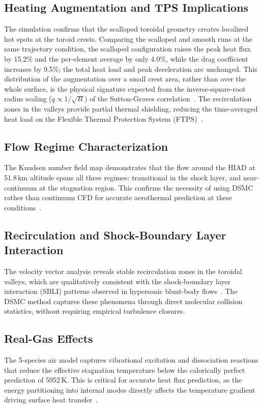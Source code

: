 \subsection{Heating Augmentation and TPS Implications}
The simulation confirms that the scalloped toroidal geometry creates localized hot spots at the toroid crests. Comparing the scalloped and smooth runs at the same trajectory condition, the scalloped configuration raises the peak heat flux by 15.2\% and the per-element average by only 4.0\%, while the drag coefficient increases by 9.5\%; the total heat load and peak deceleration are unchanged. This distribution of the augmentation over a small crest area, rather than over the whole surface, is the physical signature expected from the inverse-square-root radius scaling ($\dot{q} \propto 1/\sqrt{R}$) of the Sutton-Graves correlation~\cite{sutton1971gravesh}. The recirculation zones in the valleys provide partial thermal shielding, reducing the time-averaged heat load on the Flexible Thermal Protection System (FTPS)~\cite{hollis2018surface}.

\subsection{Flow Regime Characterization}
The Knudsen number field map demonstrates that the flow around the HIAD at 51.8\,km altitude spans all three regimes: transitional in the shock layer, and near-continuum at the stagnation region. This confirms the necessity of using DSMC rather than continuum CFD for accurate aerothermal prediction at these conditions~\cite{mos2006lowdensity}.

\subsection{Recirculation and Shock-Boundary Layer Interaction}
The velocity vector analysis reveals stable recirculation zones in the toroidal valleys, which are qualitatively consistent with the shock-boundary layer interaction (SBLI) patterns observed in hypersonic blunt-body flows~\cite{guo2019hypersonic}. The DSMC method captures these phenomena through direct molecular collision statistics, without requiring empirical turbulence closures.

\subsection{Real-Gas Effects}
The 5-species air model captures vibrational excitation and dissociation reactions that reduce the effective stagnation temperature below the calorically perfect prediction of 5952\,K. This is critical for accurate heat flux prediction, as the energy partitioning into internal modes directly affects the temperature gradient driving surface heat transfer~\cite{AndersonHypersonic}.

